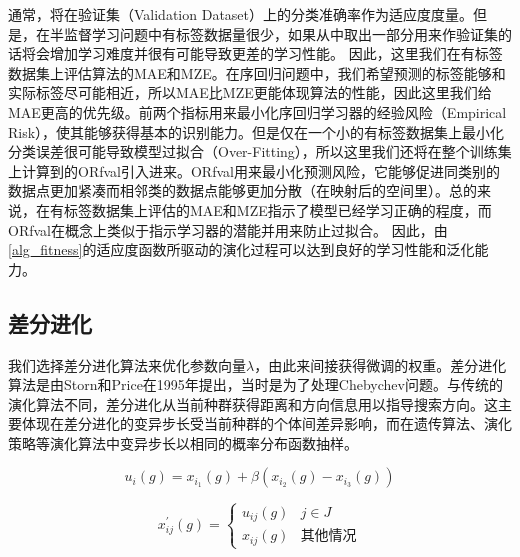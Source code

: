 通常，将在验证集（Validation Dataset）上的分类准确率作为适应度度量。但是，在半监督学习问题中有标签数据量很少，如果从中取出一部分用来作验证集的话将会增加学习难度并很有可能导致更差的学习性能。 因此，这里我们在有标签数据集上评估算法的MAE和MZE。在序回归问题中，我们希望预测的标签能够和实际标签尽可能相近，所以MAE比MZE更能体现算法的性能，因此这里我们给MAE更高的优先级。前两个指标用来最小化序回归学习器的经验风险（Empirical Risk），使其能够获得基本的识别能力。但是仅在一个小的有标签数据集上最小化分类误差很可能导致模型过拟合（Over-Fitting），所以这里我们还将在整个训练集上计算到的ORfval引入进来。ORfval用来最小化预测风险，它能够促进同类别的数据点更加紧凑而相邻类的数据点能够更加分散（在映射后的空间里）。总的来说，在有标签数据集上评估的MAE和MZE指示了模型已经学习正确的程度，而ORfval在概念上类似于指示学习器的潜能并用来防止过拟合\citep{liu2000evolutionary}\citep{liu2003evolutionary}。
因此，由\autoref{alg_fitness}的适应度函数所驱动的演化过程可以达到良好的学习性能和泛化能力。

\subsection{差分进化}

我们选择差分进化算法\citep{storn1995differential}来优化参数向量\(\lambda\)，由此来间接获得微调的权重。差分进化算法是由Storn和Price在1995年提出\citep{storn1995differential}，当时是为了处理Chebychev问题。与传统的演化算法不同，差分进化从当前种群获得距离和方向信息用以指导搜索方向。这主要体现在差分进化的变异步长受当前种群的个体间差异影响，而在遗传算法、演化策略等演化算法中变异步长以相同的概率分布函数抽样。

\begin{equation}
\label{DE_mutation}
u_{i}(g) = x_{i_{1}}(g)+\beta(x_{i_{2}}(g)-x_{i_{3}}(g))
\end{equation}

\begin{equation}
\label{DE_crossover}
x^{'}_{ij}(g)=
\begin{cases}
u_{ij}(g)& j \in J \\
x_{ij}(g)& \text{其他情况}
\end{cases}
\end{equation}

